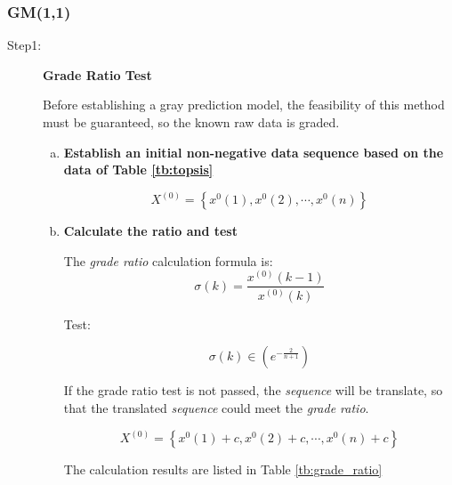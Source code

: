 \documentclass[12pt]{article}
\begin{document}
	\subsubsection{GM(1,1)}
	\begin{description}
		\item[Step1:] \textbf{Grade Ratio Test}
		
		\quad Before establishing a gray prediction model, the feasibility of this method must be guaranteed, so the known raw data is graded.
		
		\begin{enumerate}[a)]
			\item \textbf{Establish an initial non-negative data sequence based on the data of Table \ref{tb:topsis}}
			
			\begin{equation}\label{mat:list}
				X^{(0)} = \left\{ x^{0}(1),x^{0}(2),\cdots,x^{0}(n) \right\}
			\end{equation}
			
			\item \textbf{Calculate the ratio and test}
			
			The \textit{grade ratio} calculation formula is:
			\begin{equation}\label{eq:ratio}
				\sigma(k) = \frac{x^{(0)} (k - 1)}{x^{(0)} (k)}
			\end{equation}
			
			Test:
			
			\begin{equation}\label{eq:decide}
				\sigma(k) \in (e^{- \frac{2}{n+1}})
			\end{equation}
			
			If the grade ratio test is not passed, the \textit{sequence} will be translate, so that the translated \textit{sequence} could meet the \textit{grade ratio}.
			
			
			
			\begin{equation}\label{eq:move}
				X^{(0)} = \left\{ x^{0}(1)+c,x^{0}(2)+c,\cdots,x^{0}(n)+c\right\}
			\end{equation}
			
			The calculation results are listed in Table \ref{tb:grade_ratio}
			

\end{enumerate}
\end{description}
\end{document}
